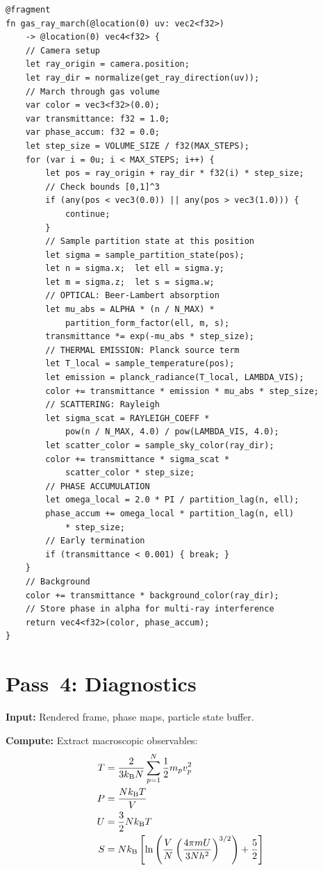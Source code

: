 \begin{lstlisting}[style=wgsl,caption={Pass 3: Gas Ray March (WGSL pseudocode)}]
@fragment
fn gas_ray_march(@location(0) uv: vec2<f32>)
    -> @location(0) vec4<f32> {
    // Camera setup
    let ray_origin = camera.position;
    let ray_dir = normalize(get_ray_direction(uv));
    // March through gas volume
    var color = vec3<f32>(0.0);
    var transmittance: f32 = 1.0;
    var phase_accum: f32 = 0.0;
    let step_size = VOLUME_SIZE / f32(MAX_STEPS);
    for (var i = 0u; i < MAX_STEPS; i++) {
        let pos = ray_origin + ray_dir * f32(i) * step_size;
        // Check bounds [0,1]^3
        if (any(pos < vec3(0.0)) || any(pos > vec3(1.0))) {
            continue;
        }
        // Sample partition state at this position
        let sigma = sample_partition_state(pos);
        let n = sigma.x;  let ell = sigma.y;
        let m = sigma.z;  let s = sigma.w;
        // OPTICAL: Beer-Lambert absorption
        let mu_abs = ALPHA * (n / N_MAX) *
            partition_form_factor(ell, m, s);
        transmittance *= exp(-mu_abs * step_size);
        // THERMAL EMISSION: Planck source term
        let T_local = sample_temperature(pos);
        let emission = planck_radiance(T_local, LAMBDA_VIS);
        color += transmittance * emission * mu_abs * step_size;
        // SCATTERING: Rayleigh
        let sigma_scat = RAYLEIGH_COEFF *
            pow(n / N_MAX, 4.0) / pow(LAMBDA_VIS, 4.0);
        let scatter_color = sample_sky_color(ray_dir);
        color += transmittance * sigma_scat *
            scatter_color * step_size;
        // PHASE ACCUMULATION
        let omega_local = 2.0 * PI / partition_lag(n, ell);
        phase_accum += omega_local * partition_lag(n, ell)
            * step_size;
        // Early termination
        if (transmittance < 0.001) { break; }
    }
    // Background
    color += transmittance * background_color(ray_dir);
    // Store phase in alpha for multi-ray interference
    return vec4<f32>(color, phase_accum);
}
\end{lstlisting}

\section{Pass~4: Diagnostics}
\label{sec:pass4}

\textbf{Input:} Rendered frame, phase maps, particle state buffer.

\textbf{Compute:} Extract macroscopic observables:
\begin{align}
    T &= \frac{2}{3k_{\mathrm{B}} N} \sum_{p=1}^{N} \frac{1}{2}m_p v_p^2 \label{eq:diag_T} \\
    P &= \frac{Nk_{\mathrm{B}} T}{V} \label{eq:diag_P} \\
    U &= \frac{3}{2}Nk_{\mathrm{B}} T \label{eq:diag_U} \\
    S &= Nk_{\mathrm{B}}\left[\ln\left(\frac{V}{N}\left(\frac{4\pi m U}{3Nh^2}\right)^{3/2}\right) + \frac{5}{2}\right] \label{eq:diag_S}
\end{align}

